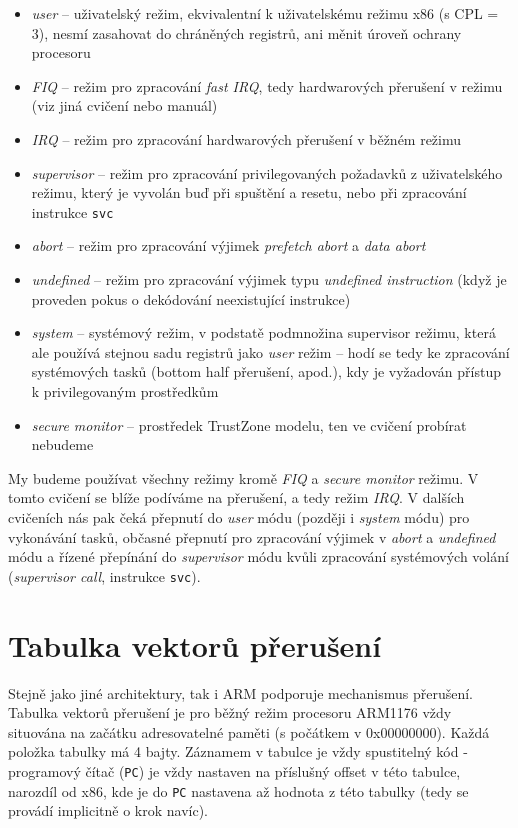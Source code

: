 \documentclass{article}
\begin{document}
\begin{itemize}
	\item \emph{user} -- uživatelský režim, ekvivalentní k uživatelskému režimu x86 (s CPL = 3), nesmí zasahovat do chráněných registrů, ani měnit úroveň ochrany procesoru
	\item \emph{FIQ} -- režim pro zpracování \emph{fast IRQ}, tedy hardwarových přerušení v  režimu (viz jiná cvičení nebo manuál)
	\item \emph{IRQ} -- režim pro zpracování hardwarových přerušení v běžném režimu
	\item \emph{supervisor} -- režim pro zpracování privilegovaných požadavků z uživatelského režimu, který je vyvolán buď při spuštění a resetu, nebo při zpracování instrukce \texttt{svc}
	\item \emph{abort} -- režim pro zpracování výjimek \emph{prefetch abort} a \emph{data abort}
	\item \emph{undefined} -- režim pro zpracování výjimek typu \emph{undefined instruction} (když je proveden pokus o dekódování neexistující instrukce)
	\item \emph{system} -- systémový režim, v podstatě podmnožina supervisor režimu, která ale používá stejnou sadu registrů jako \emph{user} režim -- hodí se tedy ke zpracování systémových tasků (bottom half přerušení, apod.), kdy je vyžadován přístup k privilegovaným prostředkům
	\item \emph{secure monitor} -- prostředek TrustZone modelu, ten ve cvičení probírat nebudeme
\end{itemize}

My budeme používat všechny režimy kromě \emph{FIQ} a \emph{secure monitor} režimu. V tomto cvičení se blíže podíváme na přerušení, a tedy režim \emph{IRQ}. V dalších cvičeních nás pak čeká přepnutí do \emph{user} módu (později i \emph{system} módu) pro vykonávání tasků, občasné přepnutí pro zpracování výjimek v \emph{abort} a \emph{undefined} módu a řízené přepínání do \emph{supervisor} módu kvůli zpracování systémových volání (\emph{supervisor call}, instrukce \texttt{svc}).

\section{Tabulka vektorů přerušení}

Stejně jako jiné architektury, tak i ARM podporuje mechanismus přerušení. Tabulka vektorů přerušení je pro běžný režim procesoru ARM1176 vždy situována na začátku adresovatelné paměti (s počátkem v 0x00000000). Každá položka tabulky má 4 bajty. Záznamem v tabulce je vždy spustitelný kód - programový čítač (\texttt{PC}) je vždy nastaven na příslušný offset v této tabulce, narozdíl od x86, kde je do \texttt{PC} nastavena až hodnota z této tabulky (tedy se provádí implicitně o krok navíc).
\end{document}
